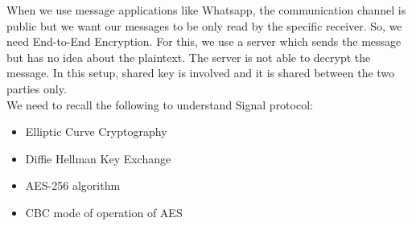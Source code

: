 \documentclass[11pt]{article}
\begin{document}
When we use message applications like Whatsapp, the communication channel is public but we want our messages to be only read by the specific receiver. So, we need End-to-End Encryption. For this, we use a server which sends the message but has no idea about the plaintext.
The server is not able to decrypt the message. In this setup, shared key is involved and it is shared between the two parties only.\\
We need to recall the following to understand Signal protocol:
\begin{itemize}
    \item Elliptic Curve Cryptography
    \item Diffie Hellman Key Exchange 
    \item AES-256 algorithm
    \item CBC mode of operation of AES
\end{itemize}
\end{document}
